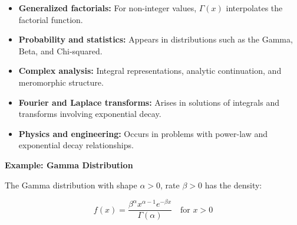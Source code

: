 \begin{itemize}

    \item \textbf{Generalized factorials:} For non-integer values, \( \Gamma(x) \) interpolates the factorial function.

    \item \textbf{Probability and statistics:} Appears in distributions such as the Gamma, Beta, and Chi-squared.

    \item \textbf{Complex analysis:} Integral representations, analytic continuation, and meromorphic structure.

    \item \textbf{Fourier and Laplace transforms:} Arises in solutions of integrals and transforms involving exponential decay.

    \item \textbf{Physics and engineering:} Occurs in problems with power-law and exponential decay relationships.

\end{itemize}

\textbf{Example: Gamma Distribution}

The Gamma distribution with shape \( \alpha > 0 \), rate \( \beta > 0 \) has the density:

\[
    f(x) = \frac{\beta^\alpha x^{\alpha - 1} e^{-\beta x}}{\Gamma(\alpha)} \quad \text{for } x > 0
\]
